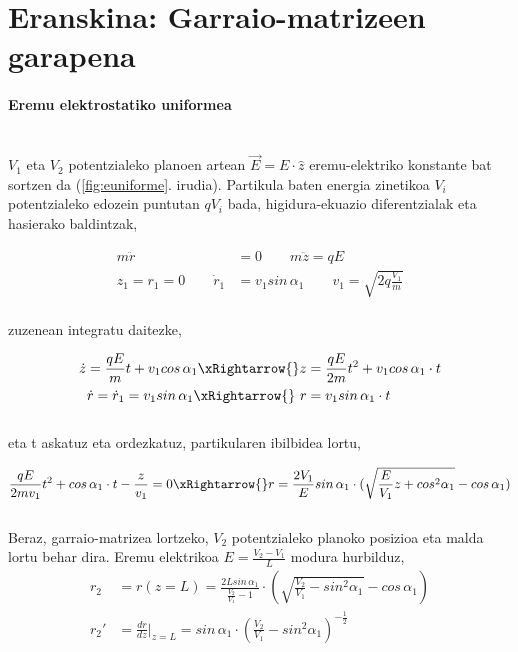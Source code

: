 \documentclass[12pt]{article}
\numberwithin{figure}{section}
\numberwithin{equation}{section}
\begin{document}
\newpage
\appendix
\section{Eranskina: Garraio-matrizeen garapena}
\label{ap:matrizeak}
\paragraph{Eremu elektrostatiko uniformea}\leavevmode\\

$V_1$ eta $V_2$ potentzialeko planoen artean $\vec{E}=E\cdot \hat{z}$ eremu-elektriko konstante bat sortzen da (\ref{fig:euniforme}. irudia). Partikula baten energia zinetikoa $V_i$ potentzialeko edozein puntutan $qV_i$ bada, higidura-ekuazio diferentzialak eta hasierako baldintzak,

\begin{equation}
   \begin{aligned}
    m\ddot{r}&=0 \qquad m\ddot{z}=qE\\
    z_1 = r_1 = 0 \qquad \dot{r}_1&=v_1sin\,\alpha_1 \qquad v_1 = \sqrt{2q\frac{V_1}{m}}
    \end{aligned} 
\end{equation}
\\ 
zuzenean integratu daitezke,

\begin{equation}
    \begin{aligned}
        \dot{z}=\frac{qE}{m}t+v_1 cos\, \alpha_1 \xRightarrow{} z&=\frac{qE}{2m}t^2+v_1 cos\, \alpha_1 \cdot t\\
        \dot{r}=\dot{r}_1=v_1sin\, \alpha_1 \xRightarrow{} \ r&= v_1 sin\,\alpha_1 \cdot t
    \end{aligned}
\end{equation}
\\
eta t askatuz eta ordezkatuz, partikularen ibilbidea lortu,

\begin{equation}
    \frac{qE}{2mv_1}t^2+ cos\, \alpha_1 \cdot t - \frac{z}{v_1}=0 \xRightarrow{} r= \frac{2V_1}{E}sin\, \alpha_1 \cdot(\sqrt{\frac{E}{V_1}z+cos^2\alpha_1}-cos\,\alpha_1)
\end{equation}
\\
Beraz, garraio-matrizea lortzeko, $V_2$ potentzialeko planoko posizioa eta malda lortu behar dira. Eremu elektrikoa $E=\frac{V_2 - V_1}{L}$ modura hurbilduz,\\
\begin{equation}
    \begin{aligned}
         r_2 &= r(z=L) = \frac{2L sin\, \alpha_1}{\frac{V_2}{V_1}-1}\cdot(\sqrt{\frac{V_2}{V_1}-sin^2\alpha_1}-cos\, \alpha_1)\\
         r_2'&=\frac{dr}{dz}|_{z=L}=sin\, \alpha_1 \cdot(\frac{V_2}{V_1}-sin^2\alpha_1)^{-\frac{1}{2}}
    \end{aligned}
    \label{eq:eremuuniforme}
\end{equation}
\end{document}
